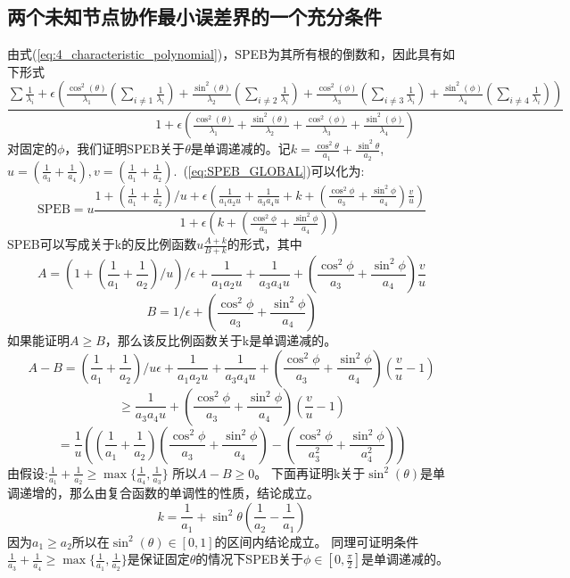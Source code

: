 \subsection{两个未知节点协作最小误差界的一个充分条件}\label{B_F_0}
由式(\ref{eq:4_characteristic_polynomial})，SPEB为其所有根的倒数和，因此具有如下形式
\begin{equation}\label{eq:SPEB_GLOBAL}
\frac{\displaystyle\sum \frac{1}{\lambda_i}+\epsilon(\frac{\cos^2(\theta)}{\lambda_1}(\sum_{i \neq 1}\frac{1}{\lambda_i})+\frac{\sin^2(\theta)}{\lambda_2}(\displaystyle\sum_{i \neq 2}\frac{1}{\lambda_i})+\frac{\cos^2(\phi)}{\lambda_3}(\sum_{i \neq 3}\frac{1}{\lambda_i})+\frac{\sin^2(\phi)}{\lambda_4}(\sum_{i \neq 4}\frac{1}{\lambda_i}))}{\displaystyle 1+\epsilon(\frac{\cos^2(\theta)}{\lambda_1}+\frac{\sin^2(\theta)}{\lambda_2}+\frac{\cos^2(\phi)}{\lambda_3}+\frac{\sin^2(\phi)}{\lambda_4})}
\end{equation}
对固定的$\phi$，我们证明SPEB关于$\theta$是单调递减的。记$k=\frac{\cos^2 \theta}{a_1}+\frac{\sin^2 \theta}{a_2}$,$u=(\frac{1}{a_3}+\frac{1}{a_4}),v=(\frac{1}{a_1}+\frac{1}{a_2})$.~(\ref{eq:SPEB_GLOBAL})可以化为:
\begin{equation}
\text{SPEB}=u\frac{1+(\frac{1}{a_1}+\frac{1}{a_2})/u+\epsilon(\frac{1}{a_1a_2 u}+\frac{1}{a_3a_4 u}+k+(\frac{\cos^2\phi}{a_3}+\frac{\sin^2\phi}{a_4})\frac{v}{u})}{1+\epsilon(k+(\frac{\cos^2\phi}{a_3}+\frac{\sin^2\phi}{a_4}))}
\end{equation}
SPEB可以写成关于k的反比例函数$u\frac{A+k}{B+k}$的形式，其中
\[
A=(1+(\frac{1}{a_1}+\frac{1}{a_2})/u)/\epsilon+\frac{1}{a_1a_2 u}+\frac{1}{a_3a_4 u}+(\frac{\cos^2\phi}{a_3}+\frac{\sin^2\phi}{a_4})\frac{v}{u}
\]
\[
B=1/\epsilon+(\frac{\cos^2\phi}{a_3}+\frac{\sin^2\phi}{a_4})
\]
如果能证明$A \geq B$，那么该反比例函数关于k是单调递减的。
\[
A-B=(\frac{1}{a_1}+\frac{1}{a_2})/u\epsilon+\frac{1}{a_1a_2 u}+\frac{1}{a_3a_4 u}+(\frac{\cos^2\phi}{a_3}+\frac{\sin^2\phi}{a_4})(\frac{v}{u}-1)
\]
\[
\geq \frac{1}{a_3a_4 u}+(\frac{\cos^2\phi}{a_3}+\frac{\sin^2\phi}{a_4})(\frac{v}{u}-1)
\]
\[
=\frac{1}{u}((\frac{1}{a_1}+\frac{1}{a_2})(\frac{\cos^2\phi}{a_3}+\frac{\sin^2\phi}{a_4})-(\frac{\cos^2\phi}{a_3^2}+\frac{\sin^2\phi}{a_4^2}))
\]
由假设:$\frac{1}{a_1}+\frac{1}{a_2}\geq \max\{\frac{1}{a_4},\frac{1}{a_3}\}$
所以$A-B\geq 0$。
下面再证明k关于$\sin^2(\theta)$是单调递增的，那么由复合函数的单调性的性质，结论成立。
\[
k=\frac{1}{a_1}+\sin^2 \theta(\frac{1}{a_2}-\frac{1}{a_1})
\]
因为$a_1\geq a_2$所以在$\sin^2(\theta)\in[0,1]$的区间内结论成立。
同理可证明条件$\frac{1}{a_3}+\frac{1}{a_4}\geq \max\{\frac{1}{a_1},\frac{1}{a_2}\}$是保证固定$\theta$的情况下SPEB关于$\phi \in [0,\frac{\pi}{2}]$是单调递减的。
